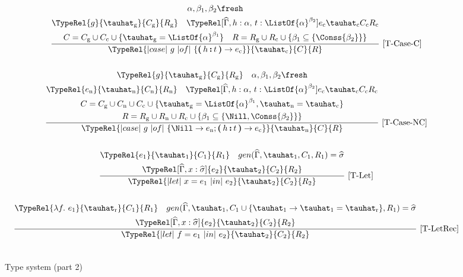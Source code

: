\begin{figure}[h!t]
\begin{gather*}
\frac
    {\begin{gathered}\alpha, \beta_1, \beta_2 \fresh\\\TypeRel{g}{\tauhat_\mathrm{g}}{C_\mathrm{g}}{R_\mathrm{g}} \quad \TypeRel[\widehat\Gamma, h:\alpha,\,t:\ListOf{\alpha}^{\beta_2}]{e_\mathrm{c}}{\tauhat_\mathrm{c}}{C_\mathrm{c}}{R_\mathrm{c}} \\ C = C_\mathrm{g} \cup C_\mathrm{c}\cup \{\tauhat_\mathrm{g} = \ListOf{\alpha}^{\beta_1}\} \quad R = R_\mathrm{g} \cup R_\mathrm{c} \cup \{ \beta_1 \subseteq \{\Conss{\beta_2}\} \}\end{gathered}}
    {\TypeRel{|case|\ g\ |of|\ \{ \textbf{(\,}h\textbf{\,:\,}t\textbf{\,)} \to e_\mathrm{c} \}}{\tauhat_\mathrm{c}}{C}{R}}
    \mbox{\ [T-Case-C]}\\ \\
\frac
    {\begin{gathered}\TypeRel{g}{\tauhat_\mathrm{g}}{C_\mathrm{g}}{R_\mathrm{g}} \quad \alpha, \beta_1, \beta_2 \fresh \\\TypeRel{e_\mathrm{n}}{\tauhat_\mathrm{n}}{C_\mathrm{n}}{R_\mathrm{n}} \quad \TypeRel[\widehat\Gamma, h:\alpha,\,t:\ListOf{\alpha}^{\beta_2}]{e_\mathrm{c}}{\tauhat_\mathrm{c}}{C_\mathrm{c}}{R_\mathrm{c}}\\C = C_\mathrm{g} \cup C_\mathrm{n}\cup C_\mathrm{c}\cup \{\tauhat_\mathrm{g} = \ListOf{\alpha}^{\beta_1}, \tauhat_\mathrm{n} = \tauhat_\mathrm{c}\} \\ R = R_\mathrm{g} \cup R_\mathrm{n} \cup R_\mathrm{c} \cup \{ \beta_1 \subseteq \{\Nill, \Conss{\beta_2}\} \}\end{gathered}}
    {\TypeRel{|case|\ g\ |of|\ \{ \Nill \to e_\mathrm{n}; \textbf{(\,}h\textbf{\,:\,}t\textbf{\,)} \to e_\mathrm{c} \}}{\tauhat_\mathrm{n}}{C}{R}}
    \mbox{\ [T-Case-NC]}\\ \\
\frac
    {\begin{gathered}\TypeRel{e_1}{\tauhat_1}{C_1}{R_1}\quad gen(\widehat\Gamma, \tauhat_1, C_1, R_1) = \widehat\sigma \\ \TypeRel[\widehat\Gamma, x:\widehat\sigma]{e_2}{\tauhat_2}{C_2}{R_2}\end{gathered}}
    {\TypeRel{|let|\ x = e_1\ |in|\ e_2}{\tauhat_2}{C_2}{R_2}}
    \mbox{\ [T-Let]}\\ \\
\frac
    {\begin{gathered}\TypeRel{\lambda f.\ e_1}{\tauhat_\mathrm{r}}{C_1}{R_1}\quad gen(\widehat\Gamma, \tauhat_1, C_1\cup\{\tauhat_1\to\tauhat_1=\tauhat_\mathrm{r}\}, R_1) = \widehat\sigma \\ \TypeRel[\widehat\Gamma, x:\widehat\sigma]{e_2}{\tauhat_2}{C_2}{R_2}\end{gathered}}
    {\TypeRel{|let|\ f = e_1\ |in|\ e_2}{\tauhat_2}{C_2}{R_2}}
    \mbox{\ [T-LetRec]}\\ \\
\end{gather*}
\caption{Type system (part 2)}
\label{DeclarativeTypeSystem2}
\end{figure}

